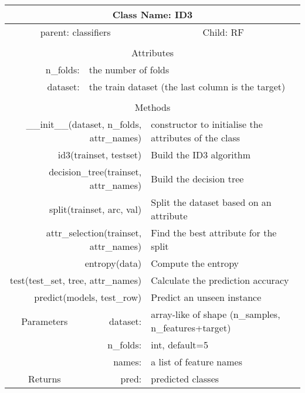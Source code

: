 {\small
\begin{tabular}{llll}
\toprule
\multicolumn{4}{|c|}{Class Name: ID3} \\
\midrule
\multicolumn{2}{|c|}{parent: classifiers} &\multicolumn{2}{|c|}{Child: RF} \\\bottomrule


\multicolumn{4}{c}{} \\\bottomrule
\multicolumn{4}{|c|}{Attributes} \\\midrule
\multicolumn{1}{|r}{n\_folds: } & \multicolumn{3}{l|}{the number of folds } \\
\multicolumn{1}{|r}{dataset: } & \multicolumn{3}{l|}{the train dataset (the last column is the target) } \\\bottomrule


\multicolumn{4}{c}{} \\\bottomrule
\multicolumn{4}{|c|}{Methods} \\\midrule
\multicolumn{2}{|r}{\_\_init\_\_(dataset, n\_folds, attr\_names) } & \multicolumn{2}{l|}{constructor to initialise the attributes of the class} \\
\multicolumn{2}{|r}{id3(trainset, testset) } & \multicolumn{2}{l|}{Build the ID3 algorithm} \\
\multicolumn{2}{|r}{decision\_tree(trainset, attr\_names) } & \multicolumn{2}{l|}{Build the decision tree} \\
\multicolumn{2}{|r}{split(trainset, arc, val) } & \multicolumn{2}{l|}{Split the dataset based on an attribute} \\
\multicolumn{2}{|r}{attr\_selection(trainset, attr\_names) } & \multicolumn{2}{l|}{Find the best attribute for the split } \\
\multicolumn{2}{|r}{entropy(data) } & \multicolumn{2}{l|}{Compute the entropy} \\
\multicolumn{2}{|r}{test(test\_set, tree, attr\_names)} & \multicolumn{2}{l|}{Calculate the prediction accuracy} \\
\multicolumn{2}{|r}{predict(models, test\_row) } & \multicolumn{2}{l|}{Predict an unseen instance} \\ \midrule


\multicolumn{1}{|c|}{Parameters}
& \multicolumn{1}{|r}{dataset:}& \multicolumn{2}{l|}{array-like of shape (n\_samples, n\_features+target)}\\
\multicolumn{1}{|l|}{} & \multicolumn{1}{|r}{n\_folds:}& \multicolumn{2}{l|}{int, default=5}\\
\multicolumn{1}{|l|}{} & \multicolumn{1}{|r}{names:}& \multicolumn{2}{l|}{a list of feature names}\\\midrule

\multicolumn{1}{|c|}{Returns} & \multicolumn{1}{|r}{pred:}& \multicolumn{2}{l|}{predicted classes}\\




\bottomrule
\end{tabular}}